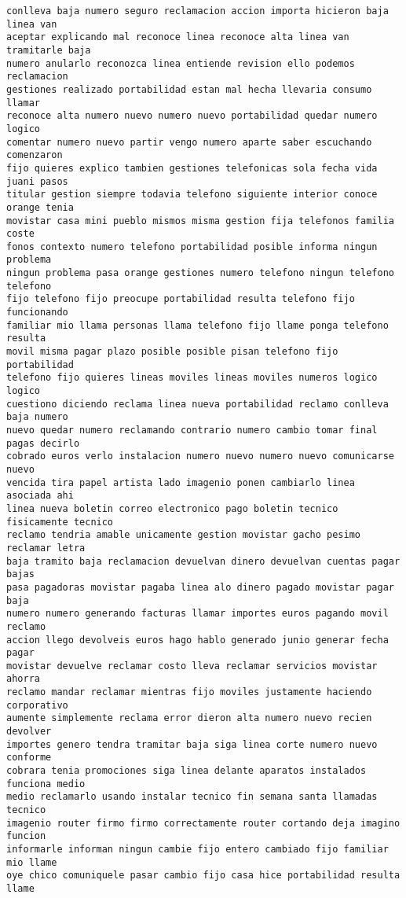 \begin{Verbatim}[commandchars=\\\{\}]
conlleva baja numero seguro reclamacion accion importa hicieron baja linea van
aceptar explicando mal reconoce linea reconoce alta linea van tramitarle baja
numero anularlo reconozca linea entiende revision ello podemos reclamacion
gestiones realizado portabilidad estan mal hecha llevaria consumo llamar
reconoce alta numero nuevo numero nuevo portabilidad quedar numero logico
comentar numero nuevo partir vengo numero aparte saber escuchando comenzaron
fijo quieres explico tambien gestiones telefonicas sola fecha vida juani pasos
titular gestion siempre todavia telefono siguiente interior conoce orange tenia
movistar casa mini pueblo mismos misma gestion fija telefonos familia coste
fonos contexto numero telefono portabilidad posible informa ningun problema
ningun problema pasa orange gestiones numero telefono ningun telefono telefono
fijo telefono fijo preocupe portabilidad resulta telefono fijo funcionando
familiar mio llama personas llama telefono fijo llame ponga telefono resulta
movil misma pagar plazo posible posible pisan telefono fijo portabilidad
telefono fijo quieres lineas moviles lineas moviles numeros logico logico
cuestiono diciendo reclama linea nueva portabilidad reclamo conlleva baja numero
nuevo quedar numero reclamando contrario numero cambio tomar final pagas decirlo
cobrado euros verlo instalacion numero nuevo numero nuevo comunicarse nuevo
vencida tira papel artista lado imagenio ponen cambiarlo linea asociada ahi
linea nueva boletin correo electronico pago boletin tecnico fisicamente tecnico
reclamo tendria amable unicamente gestion movistar gacho pesimo reclamar letra
baja tramito baja reclamacion devuelvan dinero devuelvan cuentas pagar bajas
pasa pagadoras movistar pagaba linea alo dinero pagado movistar pagar baja
numero numero generando facturas llamar importes euros pagando movil reclamo
accion llego devolveis euros hago hablo generado junio generar fecha pagar
movistar devuelve reclamar costo lleva reclamar servicios movistar ahorra
reclamo mandar reclamar mientras fijo moviles justamente haciendo corporativo
aumente simplemente reclama error dieron alta numero nuevo recien devolver
importes genero tendra tramitar baja siga linea corte numero nuevo conforme
cobrara tenia promociones siga linea delante aparatos instalados funciona medio
medio reclamarlo usando instalar tecnico fin semana santa llamadas tecnico
imagenio router firmo firmo correctamente router cortando deja imagino funcion
informarle informan ningun cambie fijo entero cambiado fijo familiar mio llame
oye chico comuniquele pasar cambio fijo casa hice portabilidad resulta llame

\end{Verbatim}
